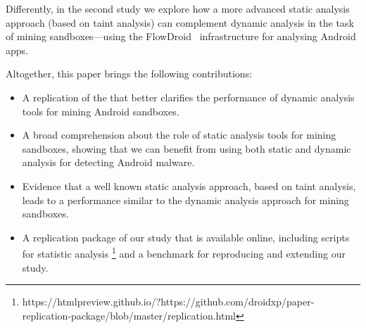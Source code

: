 Differently, in the second study we explore how a more advanced static analysis approach
(based on taint analysis) can complement dynamic analysis in the task of mining sandboxes---using
the FlowDroid~\cite{DBLP:conf/pldi/ArztRFBBKTOM14} infrastructure for analysing Android apps.

Altogether, this paper brings the following contributions:

\begin{itemize}
\item A replication of the \blls that better clarifies the performance of
  dynamic analysis tools for mining Android sandboxes.

\item A broad comprehension about the role of static analysis tools for mining
  sandboxes, showing that we can benefit from using both static and dynamic
  analysis for detecting Android malware.

\item Evidence that a well known static analysis approach, based on
  taint analysis, leads to a performance similar to the dynamic analysis
  approach for mining sandboxes.

\item A replication package of our study that is available online, including
  scripts for statistic analysis \footnote{https://htmlpreview.github.io/?https://github.com/droidxp/paper-replication-package/blob/master/replication.html}
  and a benchmark for reproducing and extending our study.
\end{itemize}




 

